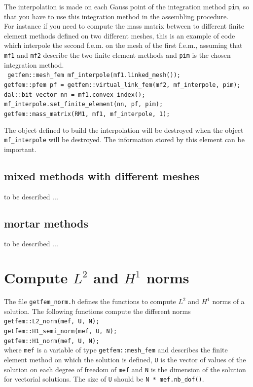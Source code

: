 \documentclass[11pt,a4paper]{article}
\begin{document}
The interpolation is made on each Gauss point of the integration method {\tt pim}, so that you have to use this integration method in the assembling procedure.\\[0.5cm]

For instance if you need to compute the mass matrix between to different finite element methods defined on two different meshes, this is an example of code which interpole the second f.e.m. on the mesh of the first f.e.m., assuming that {\tt mf1} and {\tt mf2} describe the two finite element methods and {\tt pim} is the chosen integration method.\\[0.5cm]
{\tt
  getfem::mesh\_fem mf\_interpole(mf1.linked\_mesh());\\[0.2cm]
  getfem::pfem pf = getfem::virtual\_link\_fem(mf2, mf\_interpole, pim);\\[0.2cm]
  dal::bit\_vector nn = mf1.convex\_index();\\[0.2cm]
  mf\_interpole.set\_finite\_element(nn, pf, pim);\\[0.2cm]
  getfem::mass\_matrix(RM1, mf1, mf\_interpole, 1);\\[0.2cm]
}

The object defined to build the interpolation will be destroyed when the object {\tt mf\_interpole} will be destroyed. The information stored by this element can be important.

\subsection{mixed methods with different meshes}
  to be described ...
\subsection{mortar methods}
  to be described ...


\section{Compute $L^2$ and $H^1$ norms}

The file {\tt getfem\_norm.h} defines the functions to compute $L^2$ and $H^1$ norms of a solution. The following functions compute the different norms\\[0.5cm]
{\tt getfem::L2\_norm(mef, U, N); } \\[0.5cm]
{\tt getfem::H1\_semi\_norm(mef, U, N); } \\[0.5cm]
{\tt getfem::H1\_norm(mef, U, N); } \\[0.5cm]
where {\tt mef} is a variable of type {\tt getfem::mesh\_fem} and describes the finite element method on which the solution is defined, {\tt U} is the vector of values of the solution on each degree of freedom of {\tt mef} and 
{\tt N} is the dimension of the solution for vectorial solutions. The size of  {\tt U} should be {\tt N * mef.nb\_dof()}.\\[0.5cm]
\end{document}
